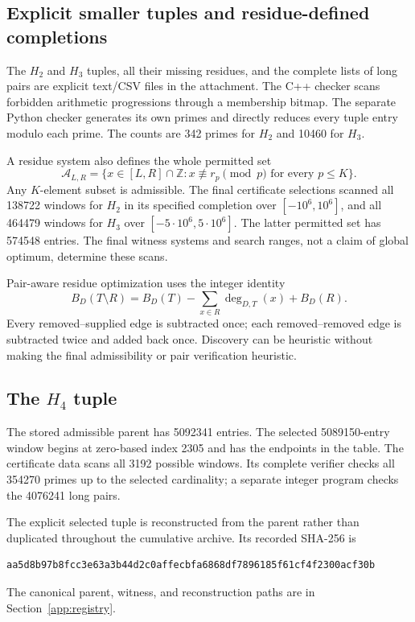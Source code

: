 \documentclass[11pt,a4paper]{article}
\theoremstyle{definition}\newtheorem{definition}[theorem]{Definition}
\theoremstyle{remark}\newtheorem{remark}[theorem]{Remark}
\numberwithin{equation}{section}
\begin{document}
\subsection{Explicit smaller tuples and residue-defined completions}
The $H_2$ and $H_3$ tuples, all their missing residues, and the complete lists of long pairs are explicit text/CSV files in the attachment. The C++ checker scans forbidden arithmetic progressions through a membership bitmap. The separate Python checker generates its own primes and directly reduces every tuple entry modulo each prime. The counts are 342 primes for $H_2$ and 10460 for $H_3$.

A residue system also defines the whole permitted set
\[
 \mathcal A_{L,R}=\{x\in[L,R]\cap\mathbb Z:x\not\equiv r_p\pmod p\text{ for every }p\le K\}.
\]
Any $K$-element subset is admissible. The final certificate selections scanned all 138722 windows for $H_2$ in its specified completion over $[-10^6,10^6]$, and all 464479 windows for $H_3$ over $[-5\cdot10^6,5\cdot10^6]$. The latter permitted set has 574548 entries. The final witness systems and search ranges, not a claim of global optimum, determine these scans.

Pair-aware residue optimization uses the integer identity
\begin{equation}\label{eq:deletionpairs}
 B_D(T\setminus R)=B_D(T)-\sum_{x\in R}\deg_{D,T}(x)+B_D(R).
\end{equation}
Every removed--supplied edge is subtracted once; each removed--removed edge is subtracted twice and added back once. Discovery can be heuristic without making the final admissibility or pair verification heuristic.

\subsection{The \texorpdfstring{$H_4$}{H4} tuple}
The stored admissible parent has 5092341 entries. The selected 5089150-entry window begins at zero-based index 2305 and has the endpoints in the table. The certificate data scans all 3192 possible windows. Its complete verifier checks all 354270 primes up to the selected cardinality; a separate integer program checks the 4076241 long pairs.

The explicit selected tuple is reconstructed from the parent rather than duplicated throughout the cumulative archive. Its recorded SHA-256 is
\begin{lstlisting}
aa5d8b97b8fcc3e63a3b44d2c0affecbfa6868df7896185f61cf4f2300acf30b
\end{lstlisting}
The canonical parent, witness, and reconstruction paths are in Section~\ref{app:registry}.
\end{document}
